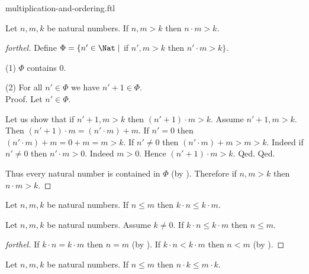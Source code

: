 \documentclass{naproche-library}
\begin{document}
\begin{smodule}{multiplication-and-ordering.ftl}
  \begin{proposition}[forthel,id=ARITHMETIC_06_1826268599287808]
    Let $n, m, k$ be natural numbers.
    If $n, m > k$ then $n \cdot m > k$.
  \end{proposition}
  \begin{proof}[forthel]
    Define $\Phi = \{ n' \in \Nat \mid$ if $n', m > k$ then $n' \cdot m > k \}$.

    (1) $\Phi$ contains $0$.

    (2) For all $n' \in \Phi$ we have $n' + 1 \in \Phi$. \\
    Proof.
      Let $n' \in \Phi$.

      Let us show that if $n' + 1, m > k$ then $(n' + 1) \cdot m > k$.
        Assume $n' + 1, m > k$.
        Then $(n' + 1) \cdot m = (n' \cdot m) + m$.
        If $n' = 0$ then
        $(n' \cdot m) + m
          = 0 + m
          = m
          > k$.
        If $n' \neq 0$ then
        $(n' \cdot m) + m
          > m
          > k$.
        Indeed if $n' \neq 0$ then $n' \cdot m > 0$.
        Indeed $m > 0$.
        Hence $(n' + 1) \cdot m > k$.
      Qed.
    Qed.

    Thus every natural number is contained in $\Phi$ (by ).
    Therefore if $n, m > k$ then $n \cdot m > k$.
  \end{proof}

  \begin{corollary}[forthel,id=ARITHMETIC_06_1751605544222720]
    Let $n, m, k$ be natural numbers.
    If $n \leq m$ then $k \cdot n \leq k \cdot m$.
  \end{corollary}

  \begin{corollary}[forthel,id=ARITHMETIC_06_3965209318260736]
    Let $n, m, k$ be natural numbers.
    Assume $k \neq 0$.
    If $k \cdot n \leq k \cdot m$ then $n \leq m$.
  \end{corollary}
  \begin{proof}[forthel]
    If $k \cdot n = k \cdot m$ then $n = m$ (by ).
    If $k \cdot n < k \cdot m$ then $n < m$ (by ).
  \end{proof}

  \begin{corollary}[forthel,id=ARITHMETIC_06_8946886668976128]
    Let $n, m, k$ be natural numbers.
    If $n \leq m$ then $n \cdot k \leq m \cdot k$.
  \end{corollary}


\end{smodule}
\end{document}
